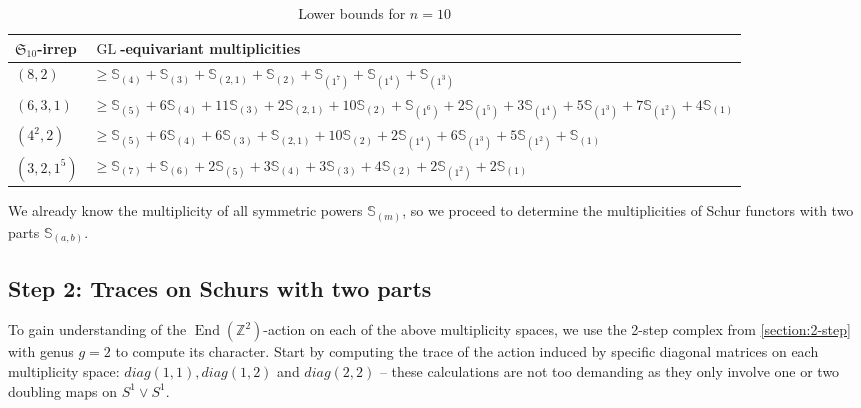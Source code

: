 \documentclass[12pt]{article}
\newcommand{\Z}{\mathbb{Z}}
\newcommand{\SymGroup}[1][n]{\mathfrak{S}_{#1}}
\newcommand{\Schur}[1]{\mathbb{S}_{#1}}
\DeclareMathOperator{\End}{End}
\DeclareMathOperator{\GL}{GL}
\theoremstyle{plain}
\theoremstyle{definition}
\theoremstyle{remark}
\begin{document}
\begin{table}[h]
    \centering
    \begin{tabular}{|m{1.7cm}|m{9.5cm}|}
\hline
$\SymGroup[10]$-irrep & $\GL$-equivariant multiplicities \\
\hline
$(8,2)$ & $\geq \Schur{(4)} + \Schur{(3)} + \Schur{(2,1)} + \Schur{(2)} + \Schur{(1^7)} + \Schur{(1^4)} + \Schur{(1^3)}$ \\
\hline
$(6,3,1)$ & $\geq \Schur{(5)} + 6\Schur{(4)} + 11\Schur{(3)} + 2\Schur{(2,1)} + 10\Schur{(2)} + \Schur{(1^6)} + 2\Schur{(1^5)} + 3\Schur{(1^4)} + 5\Schur{(1^3)} + 7\Schur{(1^2)} + 4\Schur{(1)}$ \\
\hline
$(4^2,2)$ & $\geq \Schur{(5)} + 6\Schur{(4)} + 6\Schur{(3)} + \Schur{(2,1)} + 10\Schur{(2)} + 2\Schur{(1^4)} + 6\Schur{(1^3)} + 5\Schur{(1^2)} + \Schur{(1)}$ \\
\hline
$(3,2,1^5)$ & $ \geq \Schur{(7)} + \Schur{(6)} + 2\Schur{(5)} + 3\Schur{(4)} + 3\Schur{(3)} + 4\Schur{(2)} + 2\Schur{(1^2)} + 2\Schur{(1)}$ \\
\hline
    \end{tabular}
    \caption{Lower bounds for $n=10$}
    \label{table:lower_bound_10}
\end{table}

We already know the multiplicity of all symmetric powers $\Schur{(m)}$, so we proceed to determine the multiplicities of Schur functors with two parts $\Schur{(a,b)}$.

\subsection*{Step 2: Traces on Schurs with two parts}
To gain understanding of the $\End(\Z^2)$-action on each of the above multiplicity spaces, we use the 2-step complex from \ref{section:2-step} with genus $g=2$ to compute its character. Start by computing the trace of the action induced by specific diagonal matrices on each multiplicity space: $diag(1,1), diag(1,2)$ and $diag(2,2)$  -- these calculations are not too demanding as they only involve one or two doubling maps on $S^1\vee S^1$.
\end{document}
